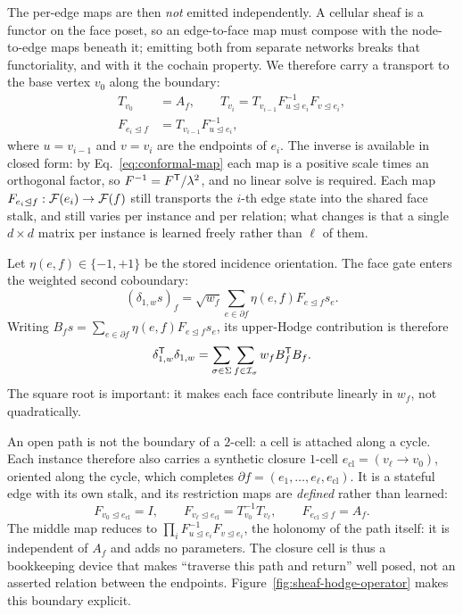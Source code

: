 The per-edge maps are then \emph{not} emitted independently.  A cellular sheaf is a functor on the
face poset, so an edge-to-face map must compose with the node-to-edge maps beneath it; emitting both
from separate networks breaks that functoriality, and with it the cochain property.  We therefore
carry a transport to the base vertex \(v_0\) along the boundary:
\begin{equation}
  \begin{aligned}
  T_{v_0}&=A_f,
  \qquad
  T_{v_i}=T_{v_{i-1}}F_{u\unlhd e_i}^{-1}F_{v\unlhd e_i},\\
  F_{e_i\unlhd f}&=T_{v_{i-1}}F_{u\unlhd e_i}^{-1},
  \end{aligned}
  \label{eq:transport}
\end{equation}
where \(u=v_{i-1}\) and \(v=v_i\) are the endpoints of \(e_i\).  The inverse is available in closed
form: by Eq.~\eqref{eq:conformal-map} each map is a positive scale times an orthogonal factor, so
\(F^{-1}=F^{\mathsf{T}}/\lambda^2\), and no linear solve is required.  Each map
\(F_{e_i\unlhd f}:\mathcal{F}(e_i)\rightarrow\mathcal{F}(f)\) still transports the \(i\)-th edge state into the
shared face stalk, and still varies per instance and per relation; what changes is that a single
\(d\times d\) matrix per instance is learned freely rather than \(\ell\) of them.

Let \(\eta(e,f)\in\{-1,+1\}\) be the stored incidence orientation.  The face gate enters the
weighted second coboundary:
\begin{equation}
  (\delta_{1,w}s)_f
  =\sqrt{w_f}\sum_{e\in\partial f}
    \eta(e,f)F_{e\unlhd f}s_e .
  \label{eq:delta1}
\end{equation}
Writing
\(B_fs=\sum_{e\in\partial f}\eta(e,f)F_{e\unlhd f}s_e\), its upper-Hodge
contribution is therefore
\begin{equation}
  \delta_{1,w}^{\mathsf{T}}\delta_{1,w}
  =\sum_{\sigma\in\Sigma}\sum_{f\in\mathcal{I}_{\sigma}}
    w_f B_f^{\mathsf{T}}B_f .
  \label{eq:weighted-up}
\end{equation}
The square root is important: it makes each face contribute linearly in \(w_f\), not quadratically.

An open path is not the boundary of a \(2\)-cell: a cell is attached along a cycle.  Each instance
therefore also carries a synthetic closure \(1\)-cell \(e_{\mathrm{cl}}=(v_\ell\rightarrow v_0)\),
oriented along the cycle, which completes \(\partial f=(e_1,\ldots,e_\ell,e_{\mathrm{cl}})\).  It is a
stateful edge with its own stalk, and its restriction maps are \emph{defined} rather than learned:
\begin{equation}
  F_{v_0\unlhd e_{\mathrm{cl}}}=I,
  \qquad
  F_{v_\ell\unlhd e_{\mathrm{cl}}}=T_{v_0}^{-1}T_{v_\ell},
  \qquad
  F_{e_{\mathrm{cl}}\unlhd f}=A_f .
  \label{eq:closure-maps}
\end{equation}
The middle map reduces to \(\prod_i F_{u\unlhd e_i}^{-1}F_{v\unlhd e_i}\), the holonomy of the path
itself: it is independent of \(A_f\) and adds no parameters.  The closure cell is thus a bookkeeping
device that makes ``traverse this path and return'' well posed, not an asserted relation between the
endpoints.  Figure~\ref{fig:sheaf-hodge-operator} makes this boundary explicit.

